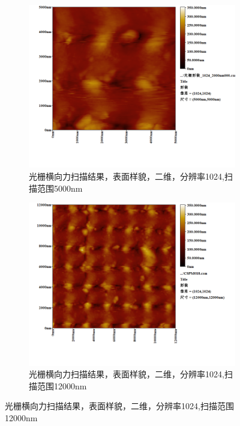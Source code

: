 \documentclass{ctexart}
\begin{document}
\begin{figure}[H]
  \centering
  \begin{subfigure}{.49\textwidth}
    \centering
    \includegraphics[width=\linewidth]{AFM结果图像/光栅表面样貌_1024_5000nm}
    \caption{光栅横向力扫描结果，表面样貌，二维，分辨率1024,扫描范围5000nm}
  \end{subfigure}
  \begin{subfigure}{.49\textwidth}
    \centering
    \includegraphics[width=\linewidth]{AFM结果图像/光栅表面样貌_1024_12000nm}
    \caption{光栅横向力扫描结果，表面样貌，二维，分辨率1024,扫描范围12000nm}
  \end{subfigure}
\end{figure}
\end{document}
